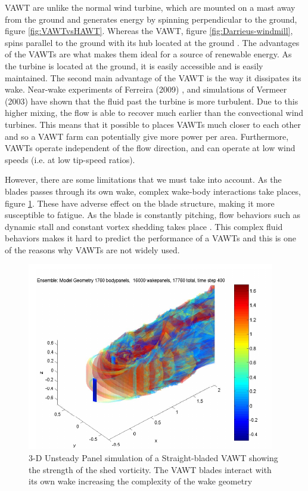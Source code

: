 VAWT are unlike the normal wind turbine, which are mounted on a mast away from the ground and generates energy by spinning perpendicular to the ground, figure \ref{fig:VAWTvsHAWT}. Whereas the VAWT, figure \ref{fig:Darrieus-windmill}, spins parallel to the ground with its hub located at the ground \cite{website:wikiVAWT}. The advantages of the VAWTs are what makes them ideal for a source of renewable energy. As the turbine is located at the ground, it is easily accessible and is easily maintained. The second main advantage of the VAWT is the way it dissipates its wake. Near-wake experiments of Ferreira (2009) \cite{SimaoFerreira2009}, and simulations of Vermeer (2003) \cite{Vermeer2003a} have shown that the fluid past the turbine is more turbulent. Due to this higher mixing, the flow is able to recover much earlier than the convectional wind turbines. This means that it possible to places VAWTs much closer to each other and so a VAWT farm can potentially give more power per area. Furthermore, VAWTs operate independent of the flow direction, and can operate at low wind speeds (i.e. at low tip-speed ratios).

However, there are some limitations that we must take into account. As the blades passes through its own wake, complex wake-body interactions take places, figure \ref{fig:3DunsteadyPanelVAWT}. These have adverse effect on the blade structure, making it more susceptible to fatigue. As the blade is constantly pitching, flow behaviors such as dynamic stall and constant vortex shedding takes place \cite{SimaoFerreira2008a}. This complex fluid behaviors makes it hard to predict the performance of a VAWTs and this is one of the reasons why VAWTs are not widely used. 

	\begin{figure}[!t]
		\centering
		\includegraphics[width=0.6\linewidth]{figures/introduction/3DunsteadyPanelVAWT.png}
		\caption{3-D Unsteady Panel simulation of a Straight-bladed VAWT showing the strength of the shed vorticity. The VAWT blades interact with its own wake increasing the complexity of the wake geometry \cite{Dixon2008}}
		\label{fig:3DunsteadyPanelVAWT}
	\end{figure}

